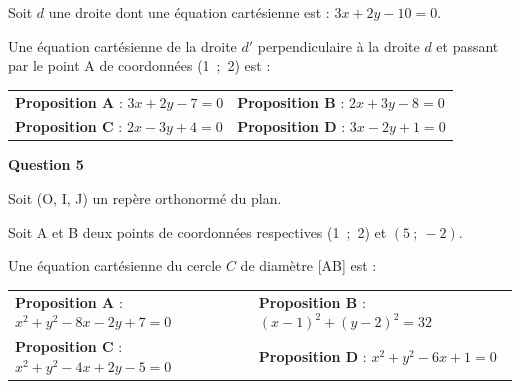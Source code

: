 Soit $d$ une droite dont une équation cartésienne est : $3x + 2y - 10 = 0$.

Une équation cartésienne de la droite $d'$ perpendiculaire à la droite $d$ et passant par le point A de coordonnées (1~;~2) est :

\begin{center}
\begin{tabularx}{\linewidth}{*{2}X}
\textbf{Proposition A }: $ 3x+2y- 7 = 0$&\textbf{Proposition B }: $2x +3y - 8= 0 $ \\
\textbf{Proposition C }: $2x- 3y+4 = 0$	& \textbf{Proposition D }: $3x - 2y +1 = 0$
\end{tabularx}
\end{center}

\medskip

\textbf{Question 5}

\medskip

Soit (O, I, J) un repère orthonormé du plan.

Soit A et B deux points de coordonnées respectives (1~;~2) et $(5~;~-2)$. 

Une équation cartésienne du cercle $C$ de diamètre [AB] est :

\begin{center}
\begin{tabularx}{\linewidth}{*{2}X}
\textbf{Proposition A }: $ x^2+y^2 - 8x- 2y + 7 = 0$ 	&\textbf{Proposition B }: $(x- 1)^2+(y - 2)^2 = 32$\\ \textbf{Proposition C }: $x^2 + y^2 - 4x +2y - 5 = 0$	& \textbf{Proposition D }: $x^2+y^2 -6x + 1 = 0$
\end{tabularx}
\end{center}


\vspace{0,5cm}
